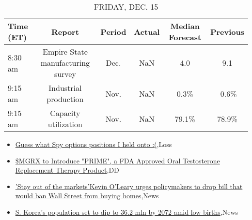 \documentclass{article}%
\begin{document}
%


\begin{table}[htbp]%
\caption{FRIDAY, DEC. 15}%
\centering%
\begin{adjustbox}{width=1\textwidth}%
\begin{tabular}{lccccc}
\toprule
Time (ET) &                            Report & Period & Actual & Median Forecast & Previous \\
\midrule
  8:30 am & Empire State manufacturing survey &   Dec. &    NaN &             4.0 &      9.1 \\
  9:15 am &             Industrial production &   Nov. &    NaN &            0.3\% &    -0.6\% \\
  9:15 am &              Capacity utilization &   Nov. &    NaN &           79.1\% &    78.9\% \\
\bottomrule
\end{tabular}
%
\end{adjustbox}%
\end{table}

%
\begin{itemize}%
\item%
\href{https://reddit.com/r/wallstreetbets/comments/18i2gwk/guess\_what\_spy\_options\_positions\_i\_held\_onto/}{Guess what Spy options positions I held onto :(},Loss%
\item%
\href{https://reddit.com/r/Baystreetbets/comments/18hhs3i/mgrx\_to\_introduce\_prime\_a\_fda\_approved\_oral/}{\$MGRX to Introduce "PRIME", a FDA Approved Oral Testosterone Replacement Therapy Product},DD%
\item%
\href{https://reddit.com/r/Economics/comments/18i4399/stay\_out\_of\_the\_marketskevin\_oleary\_urges/}{'Stay out of the markets'Kevin O'Leary urges policymakers to drop bill that would ban Wall Street from buying homes},News%
\item%
\href{https://reddit.com/r/Economics/comments/18i3b23/s\_koreas\_population\_set\_to\_dip\_to\_362\_mln\_by\_2072/}{S. Korea's population set to dip to 36.2 mln by 2072 amid low births},News%
\end{itemize}%
\end{document}
